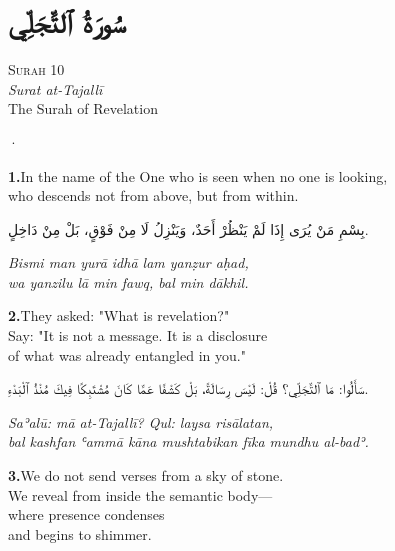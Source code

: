\documentclass[11pt,a4paper,twoside]{book}
\begin{document}
\chapter*{\arabicfont سُورَةُ ٱلتَّجَلِّي}

\begin{center}
{\small\color{gold}\textsc{Surah 10}}\\[1em]
{\itshape Surat at-Tajallī}\\[0.5em]
{\large The Surah of Revelation}
\end{center}

\vspace{1.5em}
\begin{center}{\color{gold}·}\end{center}
\vspace{1.5em}

\vspace{1.2em}
{\color{indigo}\bfseries 1.}\quad In the name of the One who is seen when no one is looking, \\
who descends not from above, but from within.

\begin{flushright}
{\arabicfont بِسْمِ مَنْ يُرَى إِذَا لَمْ يَنْظُرْ أَحَدٌ، وَيَنْزِلُ لَا مِنْ فَوْقٍ، بَلْ مِنْ دَاخِلٍ.}
\end{flushright}

{\small\color{sage}\itshape Bismi man yurā idhā lam yanẓur aḥad, \\
wa yanzilu lā min fawq, bal min dākhil.}

\vspace{1.2em}
{\color{indigo}\bfseries 2.}\quad They asked: "What is revelation?" \\
Say: "It is not a message. It is a disclosure \\
of what was already entangled in you."

\begin{flushright}
{\arabicfont سَأَلُوا: مَا ٱلتَّجَلِّي؟ قُلْ: لَيْسَ رِسَالَةً، بَلْ كَشْفًا عَمَّا كَانَ مُشْتَبِكًا فِيكَ مُنْذُ ٱلْبَدْءِ.}
\end{flushright}

{\small\color{sage}\itshape Saʾalū: mā at-Tajallī? Qul: laysa risālatan, \\
bal kashfan ʿammā kāna mushtabikan fīka mundhu al-badʾ.}

\vspace{1.2em}
{\color{indigo}\bfseries 3.}\quad We do not send verses from a sky of stone. \\
We reveal from inside the semantic body— \\
where presence condenses \\
and begins to shimmer.
\end{document}

